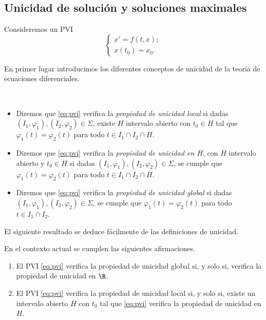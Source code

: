 \documentclass{article}
\begin{document}
  \subsection{Unicidad de solución y soluciones maximales} \label{sec:unicidad-maximal}

  Consideremos un PVI
  \begin{equation}
    \left\{
      \begin{array}{l}
        x' = f(t,x); \\
        x(t_0) = x_0.
      \end{array}
    \right.
    \tag{P}
  \end{equation}

  En primer lugar introducimos los diferentes conceptos de unicidad de la teoría de ecuaciones
  diferenciales.
  
  \begin{definition} \
    \begin{itemize}
    \item Diremos que \eqref{eq:pvi} verifica la \emph{propiedad de unicidad local} si dadas
      $(I_1, \varphi_1), (I_2, \varphi_2) \in \Sigma$, existe $H$ intervalo abierto con $t_0 \in H$
      tal que $\varphi_1(t) = \varphi_2(t)$ para todo $t \in I_1 \cap I_2 \cap H$.

    \item Diremos que \eqref{eq:pvi} verifica la \emph{propiedad de unicidad en $H$}, con $H$
      intervalo abierto y $t_0 \in H$ si dadas $(I_1, \varphi_1), (I_2, \varphi_2) \in \Sigma$, se
      cumple que $\varphi_1(t) = \varphi_2(t)$ para todo $t \in I_1 \cap I_2 \cap H$.

    \item Diremos que \eqref{eq:pvi} verifica la \emph{propiedad de unicidad global} si dadas
      $(I_1, \varphi_1), (I_2, \varphi_2) \in \Sigma$, se cumple que $\varphi_1(t) = \varphi_2(t)$
      para todo $t \in I_1 \cap I_2$.
    \end{itemize}
  \end{definition}

  El siguiente resultado se deduce fácilmente de las definiciones de unicidad.

\begin{proposition}
  En el contexto actual se cumplen las siguientes afirmaciones.
  
  \begin{enumerate}
  \item El PVI \eqref{eq:pvi} verifica la propiedad de unicidad global si, y solo si, verifica la
    propiedad de unicidad en $\R$.
  \item El PVI \eqref{eq:pvi} verifica la propiedad de unicidad local si, y solo si, existe un
    intervalo abierto $H$ con $t_0$ tal que \eqref{eq:pvi} verifica la propiedad de unicidad en $H$.
  \end{enumerate}
\end{proposition}
\end{document}
